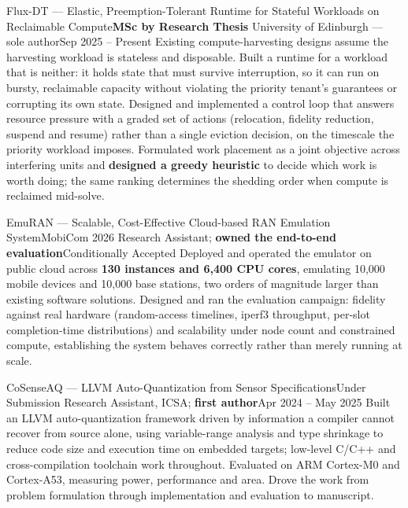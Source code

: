     \resumeSubheading
      {Flux-DT --- Elastic, Preemption-Tolerant Runtime for Stateful Workloads on Reclaimable Compute}{\textbf{MSc by Research Thesis}}
      {University of Edinburgh --- sole author}{Sep 2025 -- Present}
      \resumeItemListStart
          {Existing compute-harvesting designs assume the harvesting workload is stateless and disposable. Built a runtime for a workload that is neither: it holds state that must survive interruption, so it can run on bursty, reclaimable capacity without violating the priority tenant's guarantees or corrupting its own state.}
          {Designed and implemented a control loop that answers resource pressure with a graded set of actions (relocation, fidelity reduction, suspend and resume) rather than a single eviction decision, on the timescale the priority workload imposes.}
          {Formulated work placement as a joint objective across interfering units and \textbf{designed a greedy heuristic} to decide which work is worth doing; the same ranking determines the shedding order when compute is reclaimed mid-solve.}
      \resumeItemListEnd

    \resumeSubheading
      {EmuRAN --- Scalable, Cost-Effective Cloud-based RAN Emulation System}{MobiCom 2026}
      {Research Assistant; \textbf{owned the end-to-end evaluation}}{Conditionally Accepted}
      \resumeItemListStart
          {Deployed and operated the emulator on public cloud across \textbf{130 instances and 6{,}400 CPU cores}, emulating 10{,}000 mobile devices and 10{,}000 base stations, two orders of magnitude larger than existing software solutions.}
          {Designed and ran the evaluation campaign: fidelity against real hardware (random-access timelines, iperf3 throughput, per-slot completion-time distributions) and scalability under node count and constrained compute, establishing the system behaves correctly rather than merely running at scale.}
      \resumeItemListEnd

    \resumeSubheading
      {CoSenseAQ --- LLVM Auto-Quantization from Sensor Specifications}{Under Submission}
      {Research Assistant, ICSA; \textbf{first author}}{Apr 2024 -- May 2025}
      \resumeItemListStart
          {Built an LLVM auto-quantization framework driven by information a compiler cannot recover from source alone, using variable-range analysis and type shrinkage to reduce code size and execution time on embedded targets; low-level C/C++ and cross-compilation toolchain work throughout.}
          {Evaluated on ARM Cortex-M0 and Cortex-A53, measuring power, performance and area. Drove the work from problem formulation through implementation and evaluation to manuscript.}
      \resumeItemListEnd

  \resumeSubHeadingListEnd
